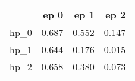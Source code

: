 \begin{tabular}{lrrr}
\toprule
{} &   ep 0 &   ep 1 &   ep 2 \\
\midrule
hp\_0 &  0.687 &  0.552 &  0.147 \\
hp\_1 &  0.644 &  0.176 &  0.015 \\
hp\_2 &  0.658 &  0.380 &  0.073 \\
\bottomrule
\end{tabular}

